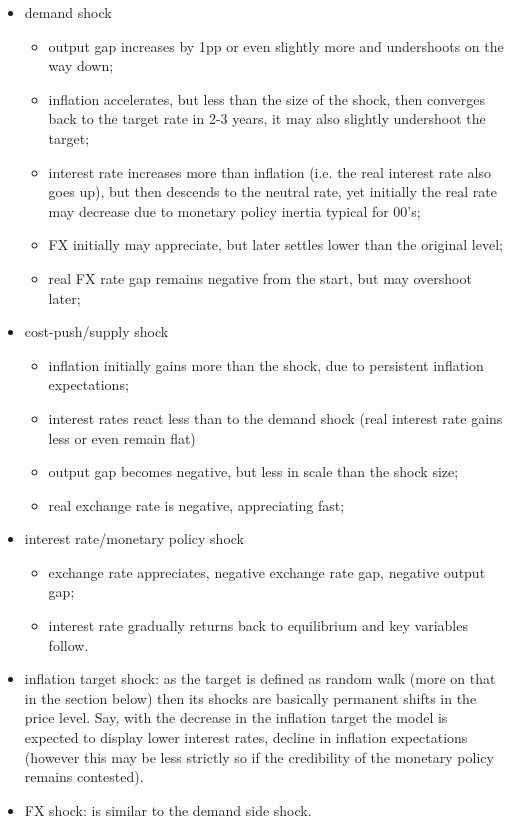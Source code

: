 \documentclass[12pt]{article}
\begin{document}
\begin{itemize}
    \item demand shock
\begin{itemize}
    \item output gap increases by 1pp or even slightly more and undershoots on the way down;
    \item inflation accelerates, but less than the size of the shock, then converges back to the target rate in 2-3 years, it may also slightly undershoot the target;
    \item interest rate increases more than inflation (i.e. the real interest rate also goes up), but then descends to the neutral rate, yet  initially the real rate may decrease due to monetary policy inertia typical for 00's;
    \item FX initially may appreciate, but later settles lower than the original level;
    \item real FX rate gap remains negative from the start, but may overshoot later;
\end{itemize}
\item cost-push/supply shock 
\begin{itemize}
    \item inflation initially gains more than the shock, due to persistent inflation expectations;
    \item interest rates react less than to the demand shock (real interest rate gains less or even remain flat)
    \item output gap becomes negative, but less in scale than the shock size;
    \item real exchange rate is negative, appreciating fast;
\end{itemize}
\item interest rate/monetary policy shock
\begin{itemize}
    \item exchange rate appreciates, negative exchange rate gap, negative output gap;
    \item interest rate gradually returns back to equilibrium and key variables follow.
\end{itemize}
\item inflation target shock: as the target is defined as random walk (more on that in the section below) then its shocks are basically permanent shifts in the price level. Say, with the decrease in the inflation target the model is expected to display lower interest rates, decline in inflation expectations (however this may be less strictly so if the credibility of the monetary policy remains contested).
\item FX shock: is similar to the demand side shock.
\end{itemize}
\end{document}
